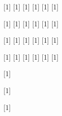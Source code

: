 [1]{} %
[1]{} %
[1]{} %
[1]{} %
[1]{} %
[1]{} %

[1]{} %
[1]{} %
[1]{} %
[1]{} %
[1]{} %
[1]{} %

[1]{} %
[1]{} %
[1]{} %
[1]{} %
[1]{} %
[1]{} %

[1]{} %
[1]{} %
[1]{} %
[1]{} %
[1]{} %
[1]{} %


%
%
\DeclareMathOperator*{\@macros@distribution@categorical@name}{\textrm{Cat}}

[1]{} %

[1]{} %

[1]{} %

